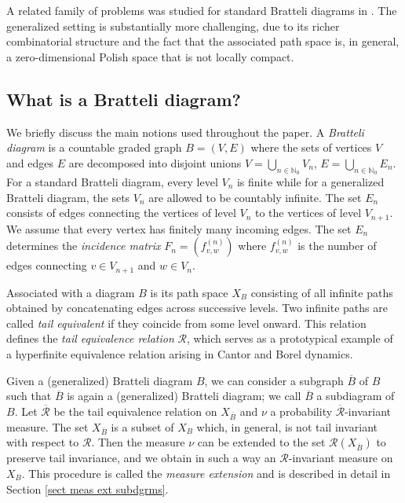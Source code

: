 \documentclass[11pt,reqno]{amsart}
\theoremstyle{definition}
\theoremstyle{remark}
\theoremstyle{plain}
\def\ol{\overline}
\newcommand{\N}{\mathbb N}
\numberwithin{equation}{section}
\begin{document}
A related family of problems was studied for standard Bratteli diagrams in \cite{AdamskaBezuglyiKarpelKwiatkowski2017}. The generalized setting is substantially more challenging, due to its richer combinatorial structure and the fact that the associated path space is, in general, a zero-dimensional Polish space that is not locally compact.

\subsection{What is a Bratteli diagram?}
We briefly discuss the main notions used throughout the paper. A \textit{Bratteli diagram} is a countable graded graph
$B = (V,E)$ where the sets of vertices $V$ and edges $E$ are decomposed into disjoint unions 
 $V = \bigcup_{n \in \N_0} V_n$, $E = \bigcup_{n \in \N_0} E_n$.
 For a standard Bratteli diagram, every level $V_n$ is finite
 while for a generalized Bratteli diagram, the sets $V_n$
are allowed to be countably infinite. The set $E_n$
consists of edges connecting the vertices of level $V_n$
to the vertices of level $V_{n+1}$.
We assume that every vertex has finitely many incoming edges.
The set $E_n$ determines the 
\textit{incidence matrix} 
$F_n = (f_{v,w}^{(n)})$ where $f_{v,w}^{(n)}$ is the number of 
edges connecting $v \in V_{n+1}$ and $w\in V_n$. 

Associated with a diagram $B$ is its path space $X_B$ consisting of all infinite paths obtained by concatenating edges across successive levels.
Two infinite paths are called \textit{tail equivalent} if they coincide from some level onward. This relation defines the \textit{tail equivalence relation} $\mathcal R$, which serves as a prototypical example of a hyperfinite equivalence relation arising in Cantor and Borel dynamics. 

Given a (generalized) Bratteli diagram $B$, we can consider a subgraph $\ol B$ of $B$ such that $\ol B$ is again a (generalized) Bratteli diagram; we call $\ol B$ a subdiagram of $B$. Let $\ol{\mathcal R}$ be the tail equivalence relation on $X_{\ol B}$ and $\nu$ a probability $\ol{\mathcal R}$-invariant measure. The set $X_{\ol B}$ is a subset of $X_B$ which, in general, is not tail invariant with respect to $\mathcal R$. Then the measure $\nu$ can be extended to the set $\mathcal R(X_{\ol B})$ to preserve tail invariance, and we obtain in such a way an $\mathcal R$-invariant measure on $X_B$. This procedure is called the \textit{measure extension} and is described in detail in Section  \ref{sect meas ext subdgrms}.
 
\end{document}
